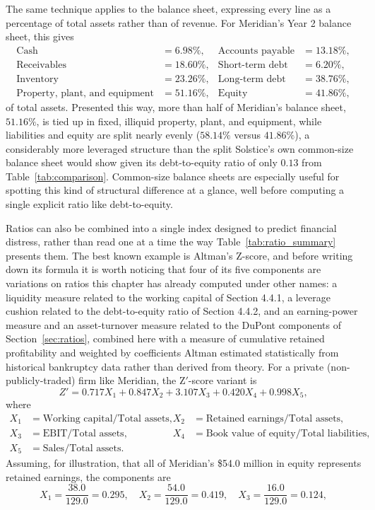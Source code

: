 \documentclass[../ai_in_finance]{subfiles}
\begin{document}
The same technique applies to the balance sheet, expressing every line as a percentage of total assets rather than of revenue. For Meridian's Year 2 balance sheet, this gives
\begin{align*}
\text{Cash} &= 6.98\%, & \text{Accounts payable} &= 13.18\%, \\
\text{Receivables} &= 18.60\%, & \text{Short-term debt} &= 6.20\%, \\
\text{Inventory} &= 23.26\%, & \text{Long-term debt} &= 38.76\%, \\
\text{Property, plant, and equipment} &= 51.16\%, & \text{Equity} &= 41.86\%,
\end{align*}
of total assets. Presented this way, more than half of Meridian's balance sheet, $51.16\%$, is tied up in fixed, illiquid property, plant, and equipment, while liabilities and equity are split nearly evenly ($58.14\%$ versus $41.86\%$), a considerably more leveraged structure than the split Solstice's own common-size balance sheet would show given its debt-to-equity ratio of only $0.13$ from Table~\ref{tab:comparison}. Common-size balance sheets are especially useful for spotting this kind of structural difference at a glance, well before computing a single explicit ratio like debt-to-equity.

Ratios can also be combined into a single index designed to predict financial distress, rather than read one at a time the way Table~\ref{tab:ratio_summary} presents them. The best known example is Altman's Z-score, and before writing down its formula it is worth noticing that four of its five components are variations on ratios this chapter has already computed under other names: a liquidity measure related to the working capital of Section 4.4.1, a leverage cushion related to the debt-to-equity ratio of Section 4.4.2, and an earning-power measure and an asset-turnover measure related to the DuPont components of Section~\ref{sec:ratios}, combined here with a measure of cumulative retained profitability and weighted by coefficients Altman estimated statistically from historical bankruptcy data rather than derived from theory. For a private (non-publicly-traded) firm like Meridian, the Z$'$-score variant is
\begin{equation*}
Z' = 0.717 X_1 + 0.847 X_2 + 3.107 X_3 + 0.420 X_4 + 0.998 X_5,
\end{equation*}
where
\begin{align*}
X_1 &= \text{Working capital}/\text{Total assets}, & X_2 &= \text{Retained earnings}/\text{Total assets}, \\
X_3 &= \text{EBIT}/\text{Total assets}, & X_4 &= \text{Book value of equity}/\text{Total liabilities}, \\
X_5 &= \text{Sales}/\text{Total assets}. & &
\end{align*}
Assuming, for illustration, that all of Meridian's \$54.0 million in equity represents retained earnings, the components are
\begin{equation*}
X_1 = \frac{38.0}{129.0} = 0.295, \quad X_2 = \frac{54.0}{129.0} = 0.419, \quad X_3 = \frac{16.0}{129.0} = 0.124,
\end{equation*}
\end{document}
